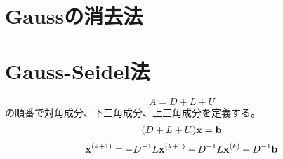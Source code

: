 \documentclass[twocolumn]{jsarticle}
\date{\today}
\author{山田龍}
\title{}
\newcommand{\kakko}[1][]{(#1)}
\newcommand{\bx}{\bold{x}}
\newcommand{\bb}{\bold{b}}
\begin{document}
\maketitle
\section{Gaussの消去法}
\section{Gauss-Seidel法}
\begin{equation}
    A = D + L + U
\end{equation}
の順番で対角成分、下三角成分、上三角成分を定義する。
\begin{align}
  (D + L + U)\bx = \bb  \\

\end{align}
\begin{equation}
    \bx^{\kakko[k+1]} = - D^{-1} L \bx^{\kakko[k+1]}\\
    - D^{-1} L \bx^{\kakko[k]} + D^{-1}\bold{b} 
\end{equation}
\end{document}
